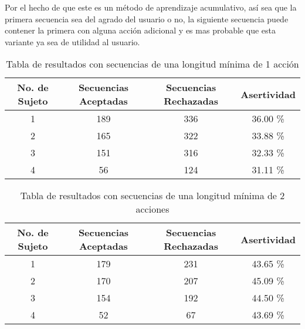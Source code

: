 Por el hecho de que este es un m\'etodo de aprendizaje acumulativo, as\'i sea
 que la primera secuencia sea del agrado del usuario o no, la siguiente 
 secuencia puede contener la primera con alguna acci\'on adicional y es mas 
 probable que esta variante ya sea de utilidad al usuario. 


\begin{table}[]
\centering
\begin{tabular}{cccc}
\hline
No. de Sujeto	
&	Secuencias Aceptadas	
&   Secuencias Rechazadas	
&	Asertividad		\\ \hline

1				
&	189						
&	336						
&	36.00 \%		\\

2				
&	165						
&	322						
&	33.88 \%		\\

3
&	151
&	316
&	32.33 \%		\\

4
&	56
&	124
&	31.11 \%		\\
\hline
\end{tabular}
\caption{Tabla de resultados con secuencias de una longitud m\'inima de 
 1 acci\'on}
\label{tableRes1}
\end{table}



\begin{table}[]
\centering
\begin{tabular}{cccc}
\hline
No. de Sujeto
&	Secuencias Aceptadas
&   Secuencias Rechazadas
&	Asertividad		\\ \hline

1
&	179
&	231
&	43.65 \%		\\
	
2
&	170
&	207
&	45.09 \%		\\

3
&	154
&	192
&	44.50 \%		\\

4
&	52
&	67
&	43.69 \%		\\
\hline
\end{tabular}
\caption{Tabla de resultados con secuencias de una longitud m\'inima de 
 2 acciones}
\label{tableRes2}
\end{table}


